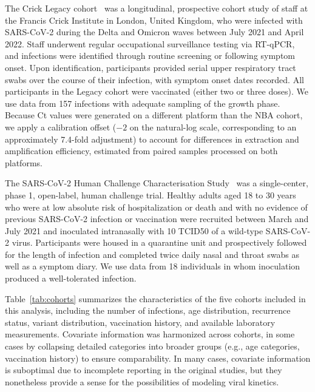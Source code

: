 \documentclass[12pt]{article}
\begin{document}
The Crick Legacy cohort~\cite{russell2024combined} was a longitudinal, prospective cohort study of staff at the Francis Crick Institute in London, United Kingdom, who were infected with SARS-CoV-2 during the Delta and Omicron waves between July 2021 and April 2022. Staff underwent regular occupational surveillance testing via RT-qPCR, and infections were identified through routine screening or following symptom onset. Upon identification, participants provided serial upper respiratory tract swabs over the course of their infection, with symptom onset dates recorded. All participants in the Legacy cohort were vaccinated (either two or three doses). We use data from 157 infections with adequate sampling of the growth phase. Because Ct values were generated on a different platform than the NBA cohort, we apply a calibration offset ($-2$ on the natural-log scale, corresponding to an approximately 7.4-fold adjustment) to account for differences in extraction and amplification efficiency, estimated from paired samples processed on both platforms.

The SARS-CoV-2 Human Challenge Characterisation Study~\cite{killingley2022safety} was a single-center, phase 1, open-label, human challenge trial. Healthy adults aged 18 to 30 years who were at low absolute risk of hospitalization or death and with no evidence of previous SARS-CoV-2 infection or vaccination were recruited between March and July 2021 and inoculated intranasally with 10 TCID50 of a wild-type SARS-CoV-2 virus. Participants were housed in a quarantine unit and prospectively followed for the length of infection and completed twice daily nasal and throat swabs as well as a symptom diary. We use data from 18 individuals in whom inoculation produced a well-tolerated infection. 

Table~\ref{tab:cohorts} summarizes the characteristics of the five cohorts included in this analysis, including the number of infections, age distribution, recurrence status, variant distribution, vaccination history, and available laboratory measurements. Covariate information was harmonized across cohorts, in some cases by collapsing detailed categories into broader groups (e.g., age categories, vaccination history) to ensure comparability. In many cases, covariate information is suboptimal due to incomplete reporting in the original studies, but they nonetheless provide a sense for the possibilities of modeling viral kinetics. 
\end{document}

